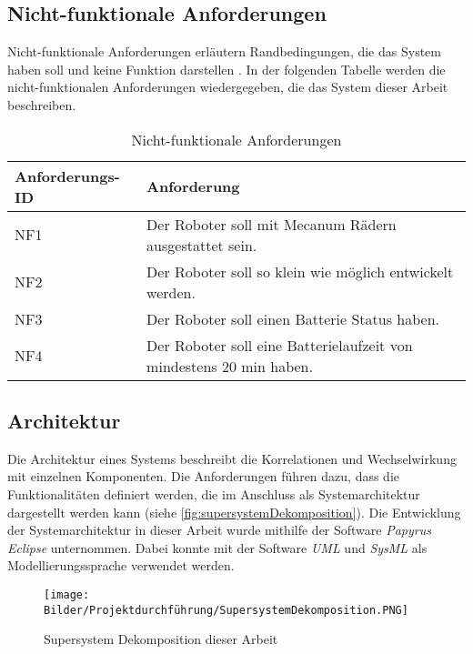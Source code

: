 \subsection{Nicht-funktionale Anforderungen}
Nicht-funktionale Anforderungen erläutern Randbedingungen, die das System haben soll und keine Funktion darstellen \cite[S.37]{Anforderungsmanagemet.2014}. In der folgenden Tabelle werden die nicht-funktionalen Anforderungen wiedergegeben, die das System dieser Arbeit beschreiben. 
\begin{table}[H]
\begin{tabularx}{\linewidth}{|l|X|}
\hline
\rowcolor{lightgray}
\textbf{Anforderungs-ID} & \textbf{Anforderung}                                                                   \\ \hline
NF1              & Der Roboter soll mit Mecanum Rädern ausgestattet sein.                                         \\ \hline
NF2              & Der Roboter soll so klein wie möglich entwickelt werden.                                      \\ \hline
NF3              & Der Roboter soll einen Batterie Status haben.                        \\ \hline
NF4              & Der Roboter soll eine Batterielaufzeit von mindestens 20 min haben. \\ \hline

\end{tabularx}
    \caption{Nicht-funktionale Anforderungen }
    \label{tab:nichtFunktionaleAnforderungen}
\end{table}

\subsection{Architektur}
Die Architektur eines Systems beschreibt die Korrelationen und Wechselwirkung mit einzelnen Komponenten. Die Anforderungen führen dazu, dass die Funktionalitäten definiert werden, die im Anschluss als Systemarchitektur dargestellt werden kann (siehe \autoref{fig:supersystemDekomposition}). Die Entwicklung der Systemarchitektur in dieser Arbeit wurde mithilfe der Software \textit{Papyrus Eclipse} unternommen. Dabei konnte mit der Software \textit{UML} und \textit{SysML} als Modellierungssprache verwendet werden.   

\begin{figure}[H]
 \centering
 \texttt{[image: Bilder/Projektdurchführung/SupersystemDekomposition.PNG]}
 \caption{Supersystem Dekomposition dieser Arbeit}
 \label{fig:supersystemDekomposition}
\end{figure}


